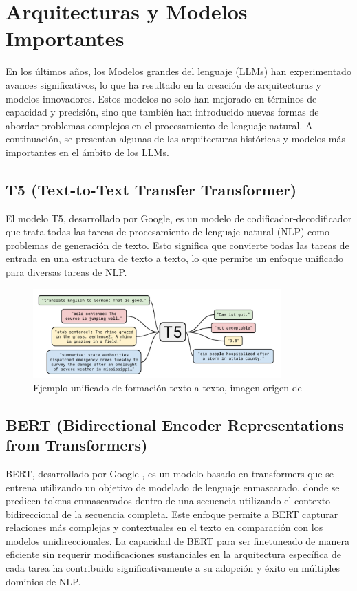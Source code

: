 \section{Arquitecturas y Modelos Importantes}
En los últimos años, los Modelos grandes del lenguaje (LLMs) han experimentado avances significativos, lo que ha resultado en la creación de arquitecturas y modelos innovadores. Estos modelos no solo han mejorado en términos de capacidad y precisión, sino que también han introducido nuevas formas de abordar problemas complejos en el procesamiento de lenguaje natural. A continuación, se presentan algunas de las arquitecturas históricas y modelos más importantes en el ámbito de los LLMs.

\subsection{T5 (Text-to-Text Transfer Transformer)}
El modelo T5, desarrollado por Google, es un modelo de codificador-decodificador que trata todas las tareas de procesamiento de lenguaje natural (NLP) como problemas de generación de texto. Esto significa que convierte todas las tareas de entrada en una estructura de texto a texto, lo que permite un enfoque unificado para diversas tareas de NLP.

\begin{figure}[h]
\centering
\includegraphics[width=0.85\textwidth]{figuras/capitulo1/t5.png}
\caption{Ejemplo unificado de formación texto a texto, imagen origen de \citep{raffel2020exploring}}
\label{fig:llm_evolution}
\end{figure}

\subsection{BERT (Bidirectional Encoder Representations from Transformers)}
BERT, desarrollado por Google \citep{devlin2018bert}, es un modelo basado en transformers que se entrena utilizando un objetivo de modelado de lenguaje enmascarado, donde se predicen tokens enmascarados dentro de una secuencia utilizando el contexto bidireccional de la secuencia completa. Este enfoque permite a BERT capturar relaciones más complejas y contextuales en el texto en comparación con los modelos unidireccionales. La capacidad de BERT para ser finetuneado de manera eficiente sin requerir modificaciones sustanciales en la arquitectura específica de cada tarea ha contribuido significativamente a su adopción y éxito en múltiples dominios de NLP.

